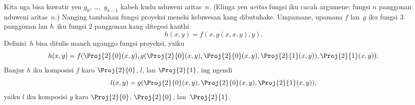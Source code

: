 \documentclass[../../../include/open-logic-section]{subfiles}
\begin{document}
Kita uga bisa kuwatir yen $g_0$, \dots,~$g_{k-1}$
kabeh kudu nduweni aritas~$n$. (Elinga yen \emph{aritas}
fungsi iku cacah argumene; fungsi $n$ panggonan nduweni
aritas~$n$.) Nanging tambahan fungsi proyeksi menehi
keluwesan kang dibutuhake. Umpamane, upamana $f$ lan~$g$
iku fungsi $3$ panggonan lan $h$~iku fungsi $2$ panggonan
kang ditegesi kanthi
\[
h(x,y) = f(x,g(x,x,y),y).
\]
Definisi~$h$ bisa ditulis maneh nganggo fungsi proyeksi,
yaiku
\[
h(x,y) = f(\Proj{2}{0}(x,y), g(\Proj{2}{0}(x,y), \Proj{2}{0}(x,y),
\Proj{2}{1}(x,y)), \Proj{2}{1}(x,y)).
\]
Banjur $h$ iku komposisi $f$ karo $\Proj{2}{0}$, $l$,
lan $\Proj{2}{1}$, ing ngendi
\[
l(x,y) = g(\Proj{2}{0}(x,y),\Proj{2}{0}(x,y),\Proj{2}{1}(x,y)),
\]
yaiku $l$ iku komposisi $g$ karo $\Proj{2}{0}$,
$\Proj{2}{0}$, lan~$\Proj{2}{1}$.
\end{document}
